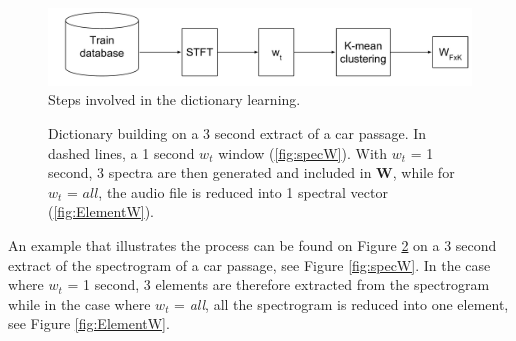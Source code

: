 \documentclass[twocolumn]{svjour3}          %
\begin{document}
\begin{figure}[t]
\centering
\includegraphics[width=\linewidth]{figures/creation_W_EN.pdf}
\caption{Steps involved in the dictionary learning.}
\label{fig:creation_W}
\end{figure}



\begin{figure}[t]
  \centering
  \caption{Dictionary building on a 3 second extract of a car passage. In dashed lines, a 1 second $w_t$ window  (\ref{fig:specW}). With $w_t$ = 1 second, 3 spectra are then generated and included in $\mathbf{W}$, while for $w_t$ = $all$, the audio file is reduced into 1 spectral vector (\ref{fig:ElementW}).}
  \label{fig:spec_elementW}
\end{figure}


An example that illustrates the process can be found on Figure \ref{fig:spec_elementW} on a 3 second extract of the spectrogram of a car passage, see Figure \ref{fig:specW}. In the case where $w_t$ = 1 second, 3 elements are therefore extracted from the spectrogram while in the case where $w_t$ = \textit{all}, all the spectrogram is reduced into one element, see Figure \ref{fig:ElementW}.
\end{document}
